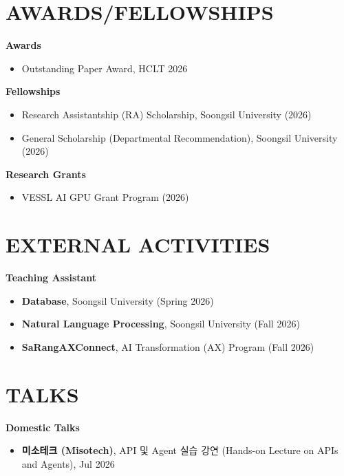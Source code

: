 \documentclass[10pt,a4paper]{article}
\newcommand{\seclabel}[1]{\section*{\uppercase{#1}}}
\begin{document}
\seclabel{Awards/Fellowships}
\textbf{Awards}
\begin{itemize}
    \item \small{Outstanding Paper Award, HCLT 2026}
\end{itemize}
\vspace{0.8em}
\textbf{Fellowships}
\begin{itemize}
    \item \small{Research Assistantship (RA) Scholarship, Soongsil University (2026)}
    \item \small{General Scholarship (Departmental Recommendation), Soongsil University (2026)}
\end{itemize}
\vspace{0.8em}
\textbf{Research Grants}
\begin{itemize}
    \item \small{VESSL AI GPU Grant Program (2026)}
\end{itemize}

\seclabel{External Activities}
\textbf{Teaching Assistant}
\begin{itemize}
    \item \small{\textbf{Database}, Soongsil University (Spring 2026)}
    \item \small{\textbf{Natural Language Processing}, Soongsil University (Fall 2026)}
    \item \small{\textbf{SaRangAXConnect}, AI Transformation (AX) Program (Fall 2026)}
\end{itemize}

\seclabel{Talks}
\textbf{Domestic Talks}
\begin{itemize}
    \item \small{\textbf{미소테크 (Misotech)}, API 및 Agent 실습 강연 (Hands-on Lecture on APIs and Agents), Jul 2026}
\end{itemize}
\end{document}
